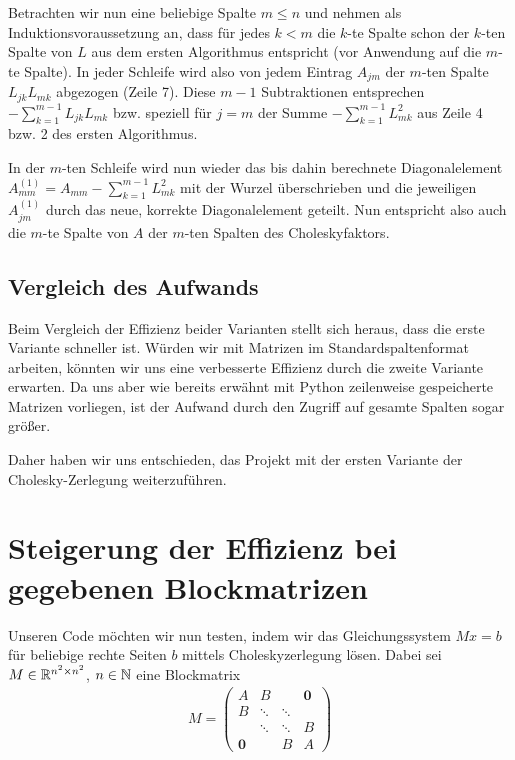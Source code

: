 \documentclass{article}
\begin{document}
Betrachten wir nun eine beliebige Spalte $m \leq n$ und nehmen als Induktionsvoraussetzung an, dass für jedes $k < m$ die $k$-te Spalte schon der $k$-ten Spalte von $L$ aus dem ersten Algorithmus entspricht (vor Anwendung auf die $m$-te Spalte). In jeder Schleife wird also von jedem Eintrag $A_{jm}$ der $m$-ten Spalte $L_{jk}L_{mk}$ abgezogen (Zeile 7). Diese $m-1$ Subtraktionen entsprechen $-\sum_{k=1}^{m-1}L_{jk}L_{mk}$ bzw. speziell für $j=m$ der Summe $-\sum_{k=1}^{m-1}L_{mk}^{2}$ aus Zeile 4 bzw. 2 des ersten Algorithmus.

In der $m$-ten Schleife wird nun wieder das bis dahin berechnete Diagonalelement $A_{mm}^{(1)} = A_{mm}-\sum_{k=1}^{m-1}L_{mk}^{2}$ mit der Wurzel überschrieben und die jeweiligen $A_{jm}^{(1)}$ durch das neue, korrekte Diagonalelement geteilt. Nun entspricht also auch die $m$-te Spalte von $A$ der $m$-ten Spalten des Choleskyfaktors.


\subsection{Vergleich des Aufwands}
Beim Vergleich der Effizienz beider Varianten stellt sich heraus, dass die erste Variante schneller ist. Würden wir mit Matrizen im Standardspaltenformat arbeiten, könnten wir uns eine verbesserte Effizienz durch die zweite Variante erwarten. Da uns aber wie bereits erwähnt mit Python zeilenweise gespeicherte Matrizen vorliegen, ist der Aufwand durch den Zugriff auf gesamte Spalten sogar größer. 

Daher haben wir uns entschieden, das Projekt mit der ersten Variante der Cholesky-Zerlegung weiterzuführen.

\section{Steigerung der Effizienz bei gegebenen Blockmatrizen}

Unseren Code möchten wir nun testen, indem wir das Gleichungssystem $Mx=b$ für beliebige rechte Seiten $b$ mittels Choleskyzerlegung lösen. Dabei sei $M \in \mathbb{R}^{n^{2} \times n^{2}}$, $n \in \mathbb{N}$ eine Blockmatrix
\begin{align*}
    M = \left(\begin{array}{cccccc}                                
                A & B && \boldsymbol{0} \\
                B & \ddots & \ddots & \\
                & \ddots & \ddots & B \\
                \boldsymbol{0} && B & A
           \end{array}
     \right)
\end{align*}
\end{document}
